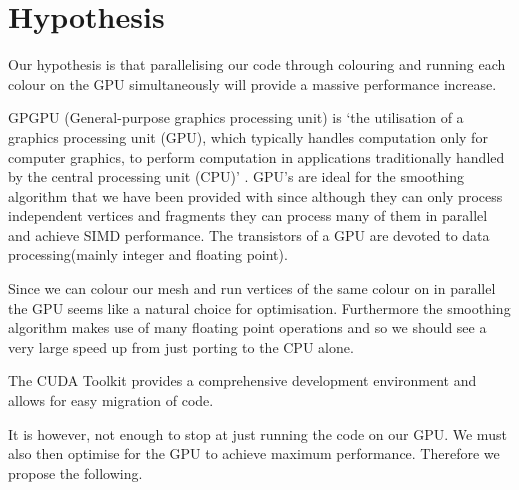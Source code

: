 \section*{Hypothesis}
Our hypothesis is that parallelising our code through colouring and running each colour on the GPU simultaneously will provide a massive performance increase.


GPGPU (General-purpose graphics processing unit) is `the utilisation of a graphics processing unit (GPU), which typically handles computation only for computer graphics, to perform computation in applications traditionally handled by the central processing unit (CPU)' \cite{gpgpu}.
GPU's are ideal for the smoothing algorithm that we have been provided with since although they can only process independent vertices and fragments they can process many of them in parallel and achieve SIMD performance. The transistors of a GPU are devoted to data processing(mainly integer and floating point)\cite{lec7}.


Since we can colour our mesh and run vertices of the same colour on in parallel the GPU seems like a natural choice for optimisation. Furthermore the smoothing algorithm makes use of many floating point operations and so we should see a very large speed up from just porting to the CPU alone.

The CUDA Toolkit provides a comprehensive development environment and allows for easy migration of code.




It is however, not enough to stop at just running the code on our GPU. We must also then optimise for the GPU to achieve maximum performance. Therefore we propose the following.




